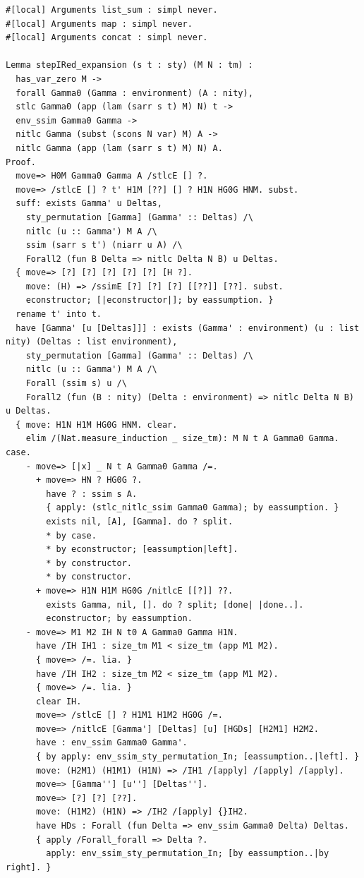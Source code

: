 \documentclass[10pt,a4paper]{article}
\begin{document}
\begin{lstlisting}[style=authorcoq]
#[local] Arguments list_sum : simpl never.
#[local] Arguments map : simpl never.
#[local] Arguments concat : simpl never.

Lemma stepIRed_expansion (s t : sty) (M N : tm) :
  has_var_zero M ->
  forall Gamma0 (Gamma : environment) (A : nity),
  stlc Gamma0 (app (lam (sarr s t) M) N) t ->
  env_ssim Gamma0 Gamma ->
  nitlc Gamma (subst (scons N var) M) A ->
  nitlc Gamma (app (lam (sarr s t) M) N) A.
Proof.
  move=> H0M Gamma0 Gamma A /stlcE [] ?.
  move=> /stlcE [] ? t' H1M [??] [] ? H1N HG0G HNM. subst.
  suff: exists Gamma' u Deltas,
    sty_permutation [Gamma] (Gamma' :: Deltas) /\
    nitlc (u :: Gamma') M A /\
    ssim (sarr s t') (niarr u A) /\
    Forall2 (fun B Delta => nitlc Delta N B) u Deltas.
  { move=> [?] [?] [?] [?] [?] [H ?].
    move: (H) => /ssimE [?] [?] [?] [[??]] [??]. subst.
    econstructor; [|econstructor|]; by eassumption. }
  rename t' into t.
  have [Gamma' [u [Deltas]]] : exists (Gamma' : environment) (u : list nity) (Deltas : list environment),
    sty_permutation [Gamma] (Gamma' :: Deltas) /\
    nitlc (u :: Gamma') M A /\
    Forall (ssim s) u /\
    Forall2 (fun (B : nity) (Delta : environment) => nitlc Delta N B) u Deltas.
  { move: H1N H1M HG0G HNM. clear.
    elim /(Nat.measure_induction _ size_tm): M N t A Gamma0 Gamma. case.
    - move=> [|x] _ N t A Gamma0 Gamma /=.
      + move=> HN ? HG0G ?.
        have ? : ssim s A.
        { apply: (stlc_nitlc_ssim Gamma0 Gamma); by eassumption. }
        exists nil, [A], [Gamma]. do ? split.
        * by case.
        * by econstructor; [eassumption|left].
        * by constructor.
        * by constructor.
      + move=> H1N H1M HG0G /nitlcE [[?]] ??.
        exists Gamma, nil, []. do ? split; [done| |done..].
        econstructor; by eassumption.
    - move=> M1 M2 IH N t0 A Gamma0 Gamma H1N.
      have /IH IH1 : size_tm M1 < size_tm (app M1 M2).
      { move=> /=. lia. }
      have /IH IH2 : size_tm M2 < size_tm (app M1 M2).
      { move=> /=. lia. }
      clear IH.
      move=> /stlcE [] ? H1M1 H1M2 HG0G /=.
      move=> /nitlcE [Gamma'] [Deltas] [u] [HGDs] [H2M1] H2M2.
      have : env_ssim Gamma0 Gamma'.
      { by apply: env_ssim_sty_permutation_In; [eassumption..|left]. }
      move: (H2M1) (H1M1) (H1N) => /IH1 /[apply] /[apply] /[apply].
      move=> [Gamma''] [u''] [Deltas''].
      move=> [?] [?] [??].
      move: (H1M2) (H1N) => /IH2 /[apply] {}IH2.
      have HDs : Forall (fun Delta => env_ssim Gamma0 Delta) Deltas.
      { apply /Forall_forall => Delta ?.
        apply: env_ssim_sty_permutation_In; [by eassumption..|by right]. }

\end{lstlisting}
\end{document}
